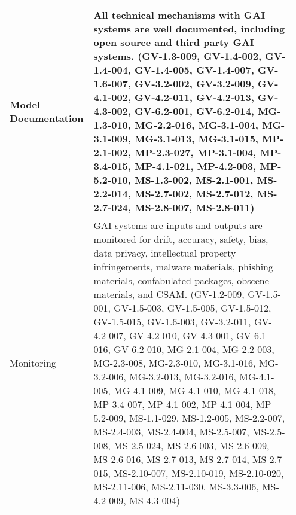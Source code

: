 \documentclass[fleqn]{article}
\begin{document}
\begin{table}[H]
\begin{tabular}{|m{0.25\linewidth} |m{0.70\linewidth} |}
		\hline
		Model Documentation & All technical mechanisms with GAI systems are well documented, including open source and third party GAI systems. (GV-1.3-009, GV-1.4-002, GV-1.4-004, GV-1.4-005, GV-1.4-007, GV-1.6-007, GV-3.2-002, GV-3.2-009, GV-4.1-002, GV-4.2-011, GV-4.2-013, GV-4.3-002, GV-6.2-001, GV-6.2-014, MG-1.3-010, MG-2.2-016, MG-3.1-004, MG-3.1-009, MG-3.1-013, MG-3.1-015, MP-2.1-002, MP-2.3-027, MP-3.1-004, MP-3.4-015, MP-4.1-021, MP-4.2-003, MP-5.2-010, MS-1.3-002, MS-2.1-001, MS-2.2-014, MS-2.7-002, MS-2.7-012, MS-2.7-024, MS-2.8-007, MS-2.8-011) \\ 
		\hline
		Monitoring & GAI systems are inputs and outputs are monitored for drift, accuracy, safety, bias, data privacy, intellectual property infringements, malware materials, phishing materials, confabulated packages, obscene materials, and CSAM. (GV-1.2-009, GV-1.5-001, GV-1.5-003, GV-1.5-005, GV-1.5-012, GV-1.5-015, GV-1.6-003, GV-3.2-011, GV-4.2-007, GV-4.2-010, GV-4.3-001, GV-6.1-016, GV-6.2-010, MG-2.1-004, MG-2.2-003, MG-2.3-008, MG-2.3-010, MG-3.1-016, MG-3.2-006, MG-3.2-013, MG-3.2-016, MG-4.1-005, MG-4.1-009, MG-4.1-010, MG-4.1-018, MP-3.4-007, MP-4.1-002, MP-4.1-004, MP-5.2-009, MS-1.1-029, MS-1.2-005, MS-2.2-007, MS-2.4-003, MS-2.4-004, MS-2.5-007, MS-2.5-008, MS-2.5-024, MS-2.6-003, MS-2.6-009, MS-2.6-016, MS-2.7-013, MS-2.7-014, MS-2.7-015, MS-2.10-007, MS-2.10-019, MS-2.10-020, MS-2.11-006, MS-2.11-030, MS-3.3-006, MS-4.2-009, MS-4.3-004) \\ 
		\hline
	\end{tabular}
\end{table}	
\pagebreak		
	
\end{document}
